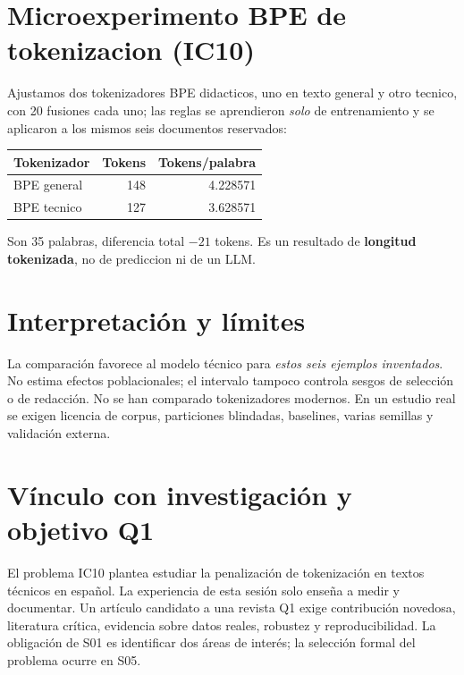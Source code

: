 \documentclass[11pt,a4paper]{article}
\begin{document}
\section{Microexperimento BPE de tokenizacion (IC10)}
Ajustamos dos tokenizadores BPE didacticos, uno en texto general y otro
tecnico, con 20 fusiones cada uno; las reglas se aprendieron \emph{solo}
de entrenamiento y se aplicaron a los mismos seis documentos reservados:
\begin{center}\begin{tabular}{lrr}\toprule
Tokenizador & Tokens & Tokens/palabra\\\midrule
BPE general & 148 & 4.228571\\
BPE tecnico & 127 & 3.628571\\\bottomrule
\end{tabular}\end{center}
Son 35 palabras, diferencia total $-21$ tokens. Es un resultado de
\textbf{longitud tokenizada}, no de prediccion ni de un LLM.
\section{Interpretación y límites}
La comparación favorece al modelo técnico para \emph{estos seis ejemplos
inventados}. No estima efectos poblacionales; el intervalo tampoco controla
sesgos de selección o de redacción. No se han comparado tokenizadores modernos.
En un estudio real se exigen licencia de corpus, particiones blindadas,
baselines, varias semillas y validación externa.
\section{Vínculo con investigación y objetivo Q1}
El problema IC10 plantea estudiar la penalización de tokenización en textos
técnicos en español. La experiencia de esta sesión solo enseña a medir y
documentar. Un artículo candidato a una revista Q1 exige contribución
novedosa, literatura crítica, evidencia sobre datos reales, robustez y
reproducibilidad. La obligación de S01 es identificar dos áreas de interés;
la selección formal del problema ocurre en S05.
\end{document}
